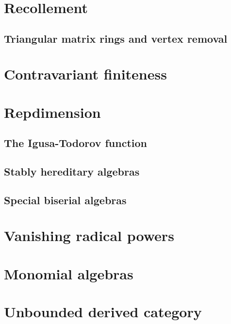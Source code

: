 \documentclass[11pt, a4paper, english]{article}
\theoremstyle{definition}
\begin{document}
\section{Recollement}


\subsection{Triangular matrix rings and vertex removal}


\section{Contravariant finiteness}


\section{Repdimension}


\subsection{The Igusa-Todorov function} \label{sec:Igusa-Todorov}


\subsection{Stably hereditary algebras}


\subsection{Special biserial algebras}
\cite{EHIS04}

\section{Vanishing radical powers}


\section{Monomial algebras}\label{sec:monomial_algebras}


\section{Unbounded derived category}

\end{document}
